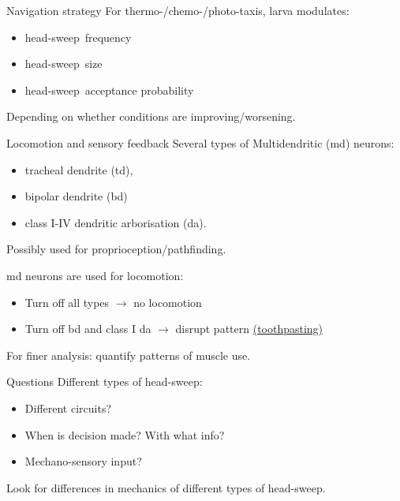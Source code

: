 \documentclass{beamer}%
\newcommand{\citerr}[1]{\hfill {\footnotesize{\color{darkgrey}\cite{#1}}}}
\newcommand{\hs}{head-sweep}
\begin{document}
\begin{frame}{Navigation strategy}
%
 For thermo-/chemo-/photo-taxis, larva modulates:
 \begin{itemize}
   \item \hs\ frequency
   \item \hs\ size
   \item \hs\ acceptance probability
 \end{itemize}
 Depending on whether conditions are improving/worsening.

 \citerr{Luo20335462}
%
\end{frame}


\begin{frame}[label=fr_loco]{Locomotion and sensory feedback}
%
 Several types of Multidendritic (md) neurons:
 \begin{itemize}
  \item tracheal dendrite (td),
  \item bipolar dendrite (bd)
  \item class I-IV dendritic arborisation (da).
 \end{itemize}
 Possibly used for proprioception/pathfinding. \\ \citerr{Bodmer1987s,Grueber12050135}

 \vp md neurons are used for locomotion:
 \begin{itemize}
   \item Turn off all types $\to$ no locomotion \citerr{Song17360325}
   \item Turn off bd and class I da $\to$ disrupt pattern \hyperlink{fr_toothpaste<1>}{(toothpasting)}\\ \citerr{Hughes17498969}%
 \end{itemize}

 \vp For finer analysis: quantify patterns of muscle use.
%
\end{frame}


\begin{frame}{Questions}
%
 Different types of \hs:
 \begin{itemize}
    \item Different circuits?
    \item When is decision made? With what info?
    \item Mechano-sensory input?
  \end{itemize}

  \vp Look for differences in mechanics of different types of \hs.
%
\end{frame}
\end{document}
